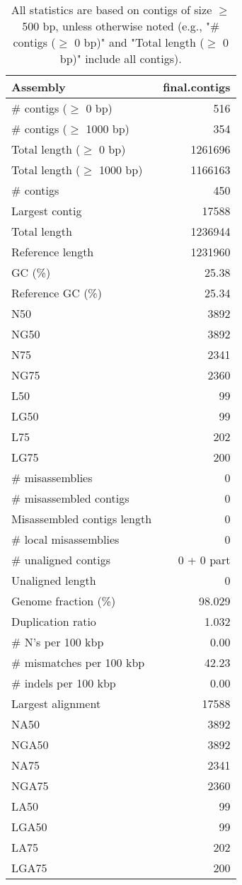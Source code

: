 \documentclass[12pt,a4paper]{article}
\begin{document}
\begin{table}[ht]
\begin{center}
\caption{All statistics are based on contigs of size $\geq$ 500 bp, unless otherwise noted (e.g., "\# contigs ($\geq$ 0 bp)" and "Total length ($\geq$ 0 bp)" include all contigs).}
\begin{tabular}{|l*{1}{|r}|}
\hline
Assembly & final.contigs \\ \hline
\# contigs ($\geq$ 0 bp) & 516 \\ \hline
\# contigs ($\geq$ 1000 bp) & 354 \\ \hline
Total length ($\geq$ 0 bp) & 1261696 \\ \hline
Total length ($\geq$ 1000 bp) & 1166163 \\ \hline
\# contigs & 450 \\ \hline
Largest contig & 17588 \\ \hline
Total length & 1236944 \\ \hline
Reference length & 1231960 \\ \hline
GC (\%) & 25.38 \\ \hline
Reference GC (\%) & 25.34 \\ \hline
N50 & 3892 \\ \hline
NG50 & 3892 \\ \hline
N75 & 2341 \\ \hline
NG75 & 2360 \\ \hline
L50 & 99 \\ \hline
LG50 & 99 \\ \hline
L75 & 202 \\ \hline
LG75 & 200 \\ \hline
\# misassemblies & 0 \\ \hline
\# misassembled contigs & 0 \\ \hline
Misassembled contigs length & 0 \\ \hline
\# local misassemblies & 0 \\ \hline
\# unaligned contigs & 0 + 0 part \\ \hline
Unaligned length & 0 \\ \hline
Genome fraction (\%) & 98.029 \\ \hline
Duplication ratio & 1.032 \\ \hline
\# N's per 100 kbp & 0.00 \\ \hline
\# mismatches per 100 kbp & 42.23 \\ \hline
\# indels per 100 kbp & 0.00 \\ \hline
Largest alignment & 17588 \\ \hline
NA50 & 3892 \\ \hline
NGA50 & 3892 \\ \hline
NA75 & 2341 \\ \hline
NGA75 & 2360 \\ \hline
LA50 & 99 \\ \hline
LGA50 & 99 \\ \hline
LA75 & 202 \\ \hline
LGA75 & 200 \\ \hline
\end{tabular}
\end{center}
\end{table}
\end{document}
